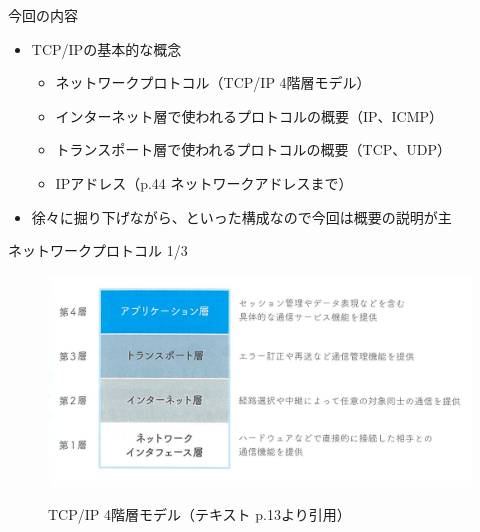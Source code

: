 \documentclass[12pt,aspectratio=169]{beamer}
\begin{document}
\begin{frame}{今回の内容}

  \begin{itemize}
    \item TCP/IPの基本的な概念
      \begin{itemize}
        \item ネットワークプロトコル（TCP/IP 4階層モデル）
        \item インターネット層で使われるプロトコルの概要（IP、ICMP）
        \item トランスポート層で使われるプロトコルの概要（TCP、UDP）
        \item IPアドレス（p.44 ネットワークアドレスまで）
      \end{itemize}
    \item 徐々に掘り下げながら、といった構成なので今回は概要の説明が主
  \end{itemize}

\end{frame}


\begin{frame}{ネットワークプロトコル 1/3}

  \centering
  \begin{figure}
    \centering
    \includegraphics[width=12cm,bb=0 0 1352 676]{./figures/text_figure1_11.png}
    \label{fig:text_figure1_11}
    \caption{TCP/IP 4階層モデル（テキスト p.13より引用）}
  \end{figure}

\end{frame}
\end{document}
